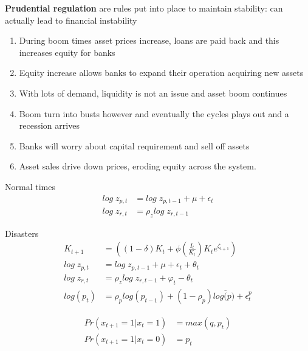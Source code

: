 \documentclass{beamer}
\begin{document}
\begin{frame}
 \textbf{Prudential regulation} are rules put into place to maintain stability: can actually lead to financial instability
  \begin{enumerate}
  \item During boom times asset prices increase, loans are paid back and this increases equity for banks 
  \item Equity increase allows banks to expand their operation acquiring new assets
  \item With lots of demand, liquidity is not an issue and asset boom continues
  \item Boom turn into busts however and eventually the cycles plays out and a recession arrives
  \item Banks will worry about capital requirement and sell off assets
  \item Asset sales drive down prices, eroding equity across the system.
\end{enumerate}
\end{frame}

\begin{frame}
 Normal times
 \begin{align}
   log\;z_{p,t}&= log\; z_{p,t-1} + \mu + \epsilon_t \\
   log\; z_{r,t} &= \rho_z log\; z_{r,t-1}
 \end{align}
\end{frame}

\begin{frame}
  Disasters
  \begin{align}
    K_{t+1} &= \left( (1-\delta)K_t + \phi \left(\frac{I_t}{K_t}\right)K_t e^{\zeta_{t+1}} \right)\\
    log\;z_{p,t}&= log\; z_{p,t-1} + \mu + \epsilon_t + \theta_t \\
    log\; z_{r,t} &= \rho_z log\; z_{r,t-1} +\varphi_t - \theta_t\\
    log(p_t) &= \rho_p log(p_{t-1}) + (1-\rho_p)log\overline(p)+\epsilon_t^p
  \end{align}

\end{frame}

\begin{frame}
 \begin{align}
   Pr(x_{t+1}=1 | x_t=1) &= max(q,p_t)\\
   Pr(x_{t+1}=1 | x_t=0) &= p_t
 \end{align}
\end{frame}
\end{document}
